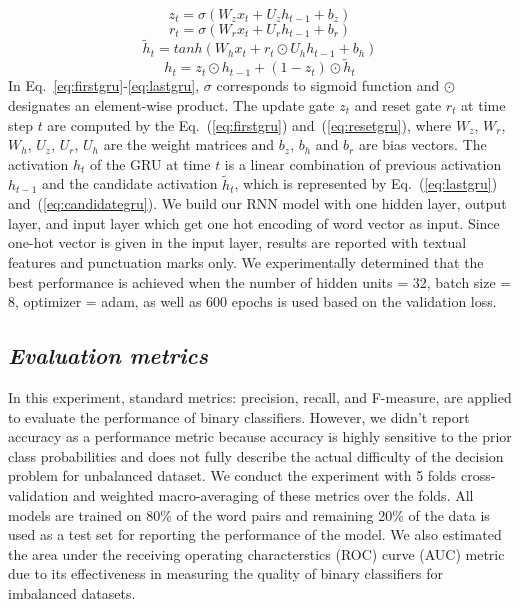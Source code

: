 \documentclass{amia}
\begin{document}
\begin{equation}
z_t = \sigma(W_zx_t + U_zh_{t-1} + b_z)
\label{eq:firstgru}
\end{equation}
\begin{equation}
r_t = \sigma(W_rx_t + U_rh_{t-1} + b_r)
\label{eq:resetgru}
\end{equation}
\begin{equation}
\tilde h_t = tanh(W_hx_t + r_t \odot U_hh_{t-1} + b_h) 
\label{eq:candidategru}
\end{equation}
\begin{equation}
h_t = z_t \odot h_{t-1} + (1-z_t) \odot \tilde h_t
\label{eq:lastgru}
\end{equation}  
In Eq.~\ref{eq:firstgru}-\ref{eq:lastgru}, $\sigma$ corresponds to sigmoid function and $\odot$ designates an element-wise product. The update gate $z_t$ and reset gate $r_t$ at time step $t$ are computed by the Eq.~(\ref{eq:firstgru}) and~(\ref{eq:resetgru}), where $W_z$, $W_r$, $W_h$, $U_z$, $U_r$, $U_h$ are the weight matrices and $b_z$, $b_h$ and $b_r$ are bias vectors. The activation $h_t$ of the GRU at time $t$ is a linear combination of previous activation $h_{t-1}$ and the candidate activation $\tilde h_t$, which is represented by Eq.~(\ref{eq:lastgru}) and~(\ref{eq:candidategru}). We build our RNN model with one hidden layer, output layer, and input layer which get one hot encoding of word vector as input. Since one-hot vector is given in the input layer, results are reported with textual features and punctuation marks only. We experimentally determined that the best performance is achieved when the number of hidden units = 32, batch size = 8, optimizer = adam, as well as 600 epochs is used based on the validation loss.         
  
\subsection*{\textit{Evaluation metrics}}
In this experiment, standard metrics: precision, recall, and F-measure, are applied to evaluate the performance of binary classifiers\cite{aas1999text}. However, we didn't report accuracy as a performance metric because accuracy is highly sensitive to the prior class probabilities and does not fully describe the actual difficulty of the decision problem for unbalanced dataset. We conduct the experiment with 5 folds cross-validation and weighted macro-averaging of these metrics over the folds. All models are trained on 80\% of the word pairs and remaining 20\% of the data is used as a test set for reporting the performance of the model. We also estimated the area under the receiving operating characterstics (ROC) curve\cite{kumar2011receiver} (AUC) metric due to its effectiveness in measuring the quality of binary classifiers for imbalanced datasets\cite{hu2015kernelized}. 
\end{document}
